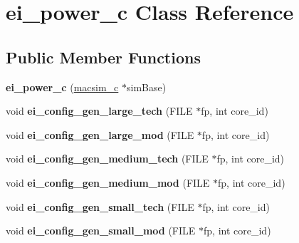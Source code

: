 \hypertarget{classei__power__c}{
\section{ei\_\-power\_\-c Class Reference}
\label{classei__power__c}
}
\subsection*{Public Member Functions}
\begin{DoxyCompactItemize}
\item 
\hypertarget{classei__power__c_ad7c1173cb11eee35231aafd98ca50957}{
{\bfseries ei\_\-power\_\-c} (\hyperlink{classmacsim__c}{macsim\_\-c} $\ast$simBase)}
\label{classei__power__c_ad7c1173cb11eee35231aafd98ca50957}

\item 
\hypertarget{classei__power__c_a047d4cd9b860db5e96300afea24397aa}{
void {\bfseries ei\_\-config\_\-gen\_\-large\_\-tech} (FILE $\ast$fp, int core\_\-id)}
\label{classei__power__c_a047d4cd9b860db5e96300afea24397aa}

\item 
\hypertarget{classei__power__c_ad085113b951e3b4a49cad925a602dfb9}{
void {\bfseries ei\_\-config\_\-gen\_\-large\_\-mod} (FILE $\ast$fp, int core\_\-id)}
\label{classei__power__c_ad085113b951e3b4a49cad925a602dfb9}

\item 
\hypertarget{classei__power__c_ac16ecdf7b0352d88607bbf342a45d093}{
void {\bfseries ei\_\-config\_\-gen\_\-medium\_\-tech} (FILE $\ast$fp, int core\_\-id)}
\label{classei__power__c_ac16ecdf7b0352d88607bbf342a45d093}

\item 
\hypertarget{classei__power__c_acd98c48063ee8bfd3ba6127a326bdd21}{
void {\bfseries ei\_\-config\_\-gen\_\-medium\_\-mod} (FILE $\ast$fp, int core\_\-id)}
\label{classei__power__c_acd98c48063ee8bfd3ba6127a326bdd21}

\item 
\hypertarget{classei__power__c_ae4d01b456277f245edf2c0c5c19e8a6a}{
void {\bfseries ei\_\-config\_\-gen\_\-small\_\-tech} (FILE $\ast$fp, int core\_\-id)}
\label{classei__power__c_ae4d01b456277f245edf2c0c5c19e8a6a}

\item 
\hypertarget{classei__power__c_ae51a19303d56d8e6ceb2cb12bfdbe843}{
void {\bfseries ei\_\-config\_\-gen\_\-small\_\-mod} (FILE $\ast$fp, int core\_\-id)}
\label{classei__power__c_ae51a19303d56d8e6ceb2cb12bfdbe843}


\end{DoxyCompactItemize}
